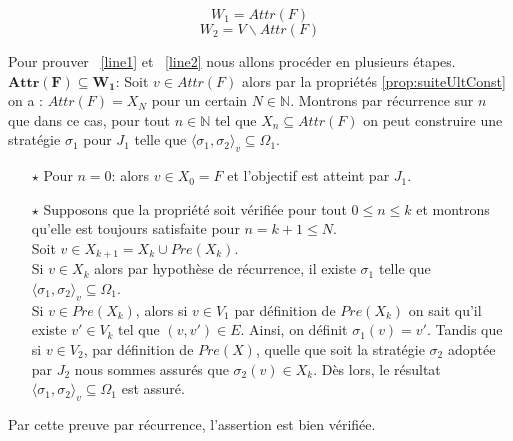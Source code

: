 	\begin{propriete}
		\label{prop:attracteur}
	\begin{equation}
		W_{1} = Attr(F) \label{line1}
	\end{equation}
	\begin{equation}
		W_{2} = V \backslash Attr(F) \label{line2}
	\end{equation}
		
	\end{propriete}
	\begin{demonstration}
		Pour prouver ~\eqref{line1} et ~\eqref{line2} nous allons procéder en plusieurs étapes.\\
		
		\noindent$\mathbf{Attr(F) \subseteq W_{1}}$: Soit $v \in Attr(F)$ alors par la propriétés \ref{prop:suiteUltConst} on a : $Attr(F) = X_{N}$ pour un certain $N \in \mathbb{N}$. Montrons par récurrence sur $n$ que dans ce cas, pour tout $n \in \mathbb{N}$ tel que $X_{n} \subseteq Attr(F)$ on peut construire une stratégie $\sigma _{1}$ pour $J_{1}$ telle que $\langle \sigma _{1},\sigma _{2}\rangle_v \subseteq \Omega _{1}$.
		\begin{enumerate}
			\item[$\star$] Pour $n=0$: alors $v \in X_{0} = F$ et l'objectif est atteint par $J_{1}$.
			\item[$\star$] Supposons que la propriété soit vérifiée pour tout $ 0 \leq n \leq k $ et montrons qu'elle est toujours satisfaite pour $n = k + 1 \leq N$. \\
			Soit $v \in X_{k+1} = X_{k} \cup Pre(X_{k})$. \\
			Si $v \in X_{k}$ alors par hypothèse de récurrence, il existe $\sigma _{1}$ telle que $ \langle \sigma _{1},\sigma _{2} \rangle_v \subseteq \Omega _{1}$.\\
			Si $v \in Pre(X_{k})$, alors si $v \in V_{1}$ par définition de $Pre(X_{k})$ on sait qu'il existe $v'\in V_{k}$ tel que $(v,v')\in E$. Ainsi, on définit $\sigma _{1}(v) = v'$. Tandis que si $v \in V_{2}$, par définition de $Pre(X)$, quelle que soit la stratégie $\sigma _{2}$ adoptée par $J_{2}$  nous sommes assurés que $\sigma _{2}(v) \in X_{k}$. Dès lors, le résultat $ \langle \sigma _{1},\sigma _{2} \rangle_v \subseteq \Omega _{1}$ est assuré.
		\end{enumerate}
		Par cette preuve par récurrence, l'assertion est bien vérifiée.\\
		

\end{demonstration}
